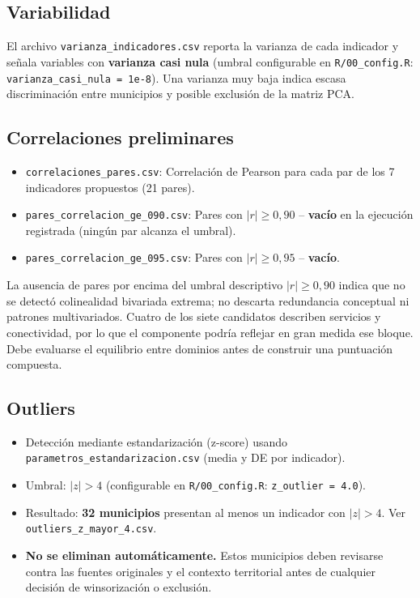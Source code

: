 \subsection{Variabilidad}
\label{sec:variabilidad}

El archivo \texttt{varianza\_indicadores.csv} reporta la varianza de cada indicador y señala variables con \textbf{varianza casi nula} (umbral configurable en \texttt{R/00\_config.R}: \texttt{varianza\_casi\_nula = 1e-8}). Una varianza muy baja indica escasa discriminación entre municipios y posible exclusión de la matriz PCA.

\subsection{Correlaciones preliminares}
\label{sec:correlaciones_preliminares}

\begin{itemize}
    \item \texttt{correlaciones\_pares.csv}: Correlación de Pearson para cada par de los 7 indicadores propuestos (21 pares).
    \item \texttt{pares\_correlacion\_ge\_090.csv}: Pares con $|r| \ge 0,90$ -- \textbf{vacío} en la ejecución registrada (ningún par alcanza el umbral).
    \item \texttt{pares\_correlacion\_ge\_095.csv}: Pares con $|r| \ge 0,95$ -- \textbf{vacío}.
\end{itemize}

La ausencia de pares por encima del umbral descriptivo $|r|\ge0,90$ indica que no se detectó colinealidad bivariada extrema; no descarta redundancia conceptual ni patrones multivariados. Cuatro de los siete candidatos describen servicios y conectividad, por lo que el componente podría reflejar en gran medida ese bloque. Debe evaluarse el equilibrio entre dominios antes de construir una puntuación compuesta.

\subsection{Outliers}
\label{sec:outliers}

\begin{itemize}
    \item Detección mediante estandarización (z-score) usando \texttt{parametros\_estandarizacion.csv} (media y DE por indicador).
    \item Umbral: $|z| > 4$ (configurable en \texttt{R/00\_config.R}: \texttt{z\_outlier = 4.0}).
    \item Resultado: \textbf{32 municipios} presentan al menos un indicador con $|z| > 4$. Ver \texttt{outliers\_z\_mayor\_4.csv}.
    \item \textbf{No se eliminan automáticamente.} Estos municipios deben revisarse contra las fuentes originales y el contexto territorial antes de cualquier decisión de winsorización o exclusión.
\end{itemize}

